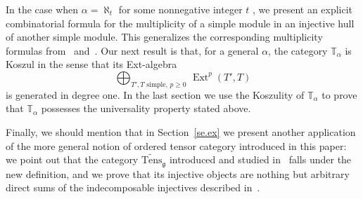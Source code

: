 \documentclass[11pt]{article}
\theoremstyle{plain}
\theoremstyle{nonumberplain}
\theoremstyle{plain}
\theoremstyle{nonumberplain}
\newcommand\bT{\mathbb T}
\newcommand\fg{\mathfrak{g}}
\DeclareMathOperator{\ext}{\mathrm{Ext}}
\begin{document}
In the case when $\alpha=\aleph_t$ for some nonnegative integer $t$ , we present an explicit combinatorial formula for the multiplicity of a simple module in an injective hull of another simple module.  This generalizes the corresponding multiplicity formulas from~\cite{PS} and~\cite{us}.  Our next result is that, for a general $\alpha$, the
category $\bT_\alpha$ is Koszul in the sense that its Ext-algebra
\begin{equation*}
	\bigoplus_{T',T\text{ simple},\,p\geq 0}\,\ext^p\left(T',T\right)  
\end{equation*}
is generated in degree one.  In the last section we use the Koszulity of $\mathbb{T}_\alpha$ to prove that $\mathbb{T}_\alpha$ possesses the universality property stated above.  

Finally, we should mention that in Section~\ref{se.ex} we present another application of the more general notion of ordered tensor category introduced in this paper: we point out that the category $\widetilde{\mathrm{Tens}}_{\fg}$ introduced and studied in~\cite{PS1} falls under the new definition, and we prove that its injective objects are nothing but arbitrary direct sums of the indecomposable injectives described in~\cite{PS1}.  
\end{document}

